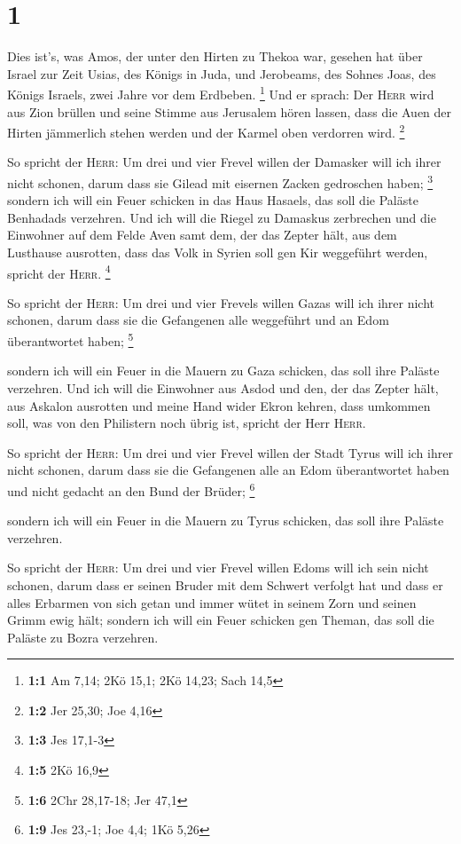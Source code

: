 \hypertarget{section}{%
\section{1}\label{section}}

 Dies ist's, was Amos, der unter den Hirten zu Thekoa war,
gesehen hat über Israel zur Zeit Usias, des Königs in Juda, und
Jerobeams, des Sohnes Joas, des Königs Israels, zwei Jahre vor dem
Erdbeben. \footnote{\textbf{1:1} Am 7,14; 2Kö 15,1; 2Kö 14,23; Sach 14,5}
 Und er sprach: Der \textsc{Herr} wird aus Zion brüllen
und seine Stimme aus Jerusalem hören lassen, dass die Auen der Hirten
jämmerlich stehen werden und der Karmel oben verdorren wird. \footnote{\textbf{1:2}
  Jer 25,30; Joe 4,16}

 So spricht der \textsc{Herr}: Um drei und vier Frevel
willen der Damasker will ich ihrer nicht schonen, darum dass sie Gilead
mit eisernen Zacken gedroschen haben; \footnote{\textbf{1:3} Jes 17,1-3}
 sondern ich will ein Feuer schicken in das Haus Hasaels,
das soll die Paläste Benhadads verzehren.  Und ich will
die Riegel zu Damaskus zerbrechen und die Einwohner auf dem Felde Aven
samt dem, der das Zepter hält, aus dem Lusthause ausrotten, dass das
Volk in Syrien soll gen Kir weggeführt werden, spricht der
\textsc{Herr}. \footnote{\textbf{1:5} 2Kö 16,9}

 So spricht der \textsc{Herr}: Um drei und vier Frevels
willen Gazas will ich ihrer nicht schonen, darum dass sie die Gefangenen
alle weggeführt und an Edom überantwortet haben; \footnote{\textbf{1:6}
  2Chr 28,17-18; Jer 47,1}

 sondern ich will ein Feuer in die Mauern zu Gaza
schicken, das soll ihre Paläste verzehren.  Und ich will
die Einwohner aus Asdod und den, der das Zepter hält, aus Askalon
ausrotten und meine Hand wider Ekron kehren, dass umkommen soll, was von
den Philistern noch übrig ist, spricht der Herr \textsc{Herr}.

 So spricht der \textsc{Herr}: Um drei und vier Frevel
willen der Stadt Tyrus will ich ihrer nicht schonen, darum dass sie die
Gefangenen alle an Edom überantwortet haben und nicht gedacht an den
Bund der Brüder; \footnote{\textbf{1:9} Jes 23,-1; Joe 4,4; 1Kö 5,26}

 sondern ich will ein Feuer in die Mauern zu Tyrus
schicken, das soll ihre Paläste verzehren.

 So spricht der \textsc{Herr}: Um drei und vier Frevel
willen Edoms will ich sein nicht schonen, darum dass er seinen Bruder
mit dem Schwert verfolgt hat und dass er alles Erbarmen von sich getan
und immer wütet in seinem Zorn und seinen Grimm ewig hält;
 sondern ich will ein Feuer schicken gen Theman, das soll
die Paläste zu Bozra verzehren.

